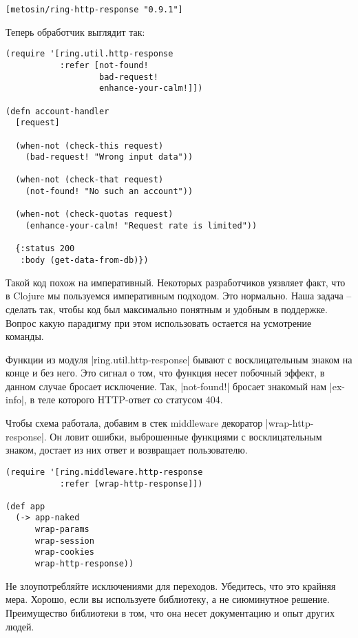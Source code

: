 \begin{verbatim}
[metosin/ring-http-response "0.9.1"]
\end{verbatim}

Теперь обработчик выглядит так:

\begin{verbatim}
(require '[ring.util.http-response
           :refer [not-found!
                   bad-request!
                   enhance-your-calm!]])

(defn account-handler
  [request]

  (when-not (check-this request)
    (bad-request! "Wrong input data"))

  (when-not (check-that request)
    (not-found! "No such an account"))

  (when-not (check-quotas request)
    (enhance-your-calm! "Request rate is limited"))

  {:status 200
   :body (get-data-from-db)})
\end{verbatim}

Такой код похож на императивный. Некоторых разработчиков уязвляет факт, что в
Clojure мы пользуемся императивным подходом. Это нормально. Наша задача --
сделать так, чтобы код был максимально понятным и удобным в поддержке. Вопрос
какую парадигму при этом использовать остается на усмотрение команды.

Функции из модуля \spverb|ring.util.http-response| бывают с восклицательным знаком на
конце и без него. Это сигнал о том, что функция несет побочный эффект, в данном
случае бросает исключение. Так, \spverb|not-found!| бросает знакомый нам \spverb|ex-info|, в
теле которого HTTP-ответ со статусом 404.

Чтобы схема работала, добавим в стек middleware декоратор
\spverb|wrap-http-response|. Он ловит ошибки, выброшенные функциями с восклицательным
знаком, достает из них ответ и возвращает пользователю.

\begin{verbatim}
(require '[ring.middleware.http-response
           :refer [wrap-http-response]])

(def app
  (-> app-naked
      wrap-params
      wrap-session
      wrap-cookies
      wrap-http-response))
\end{verbatim}

Не злоупотребляйте исключениями для переходов. Убедитесь, что это крайняя
мера. Хорошо, если вы используете библиотеку, а не сиюминутное
решение. Преимущество библиотеки в том, что она несет документацию и опыт других
людей.

